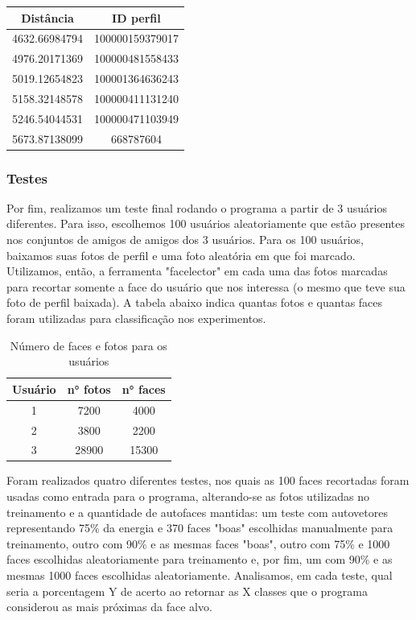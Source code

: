 \documentclass[10pt,a4paper]{article}
\begin{document}
\begin{enumerate}
\begin{table}[h!]
\begin{center}
\begin{tabular}{cc}
Distância & ID perfil \\
\hline
4632.66984794 & 100000159379017\\
4976.20171369 & 100000481558433\\
5019.12654823 & 100001364636243\\
5158.32148578 & 100000411131240\\
5246.54044531 & 100000471103949\\
5673.87138099 & 668787604
\end{tabular}
\end{center}
\end{table}

\end{enumerate}

\subsubsection*{Testes }

Por fim, realizamos um teste final rodando o programa a partir de 3 usuários diferentes. Para isso, escolhemos 100 usuários aleatoriamente que estão presentes nos conjuntos de amigos de amigos dos 3 usuários. Para os 100 usuários, baixamos suas fotos de perfil e uma foto aleatória em que foi marcado. Utilizamos, então, a ferramenta "facelector" em cada uma das fotos marcadas para recortar somente a face do usuário que nos interessa (o mesmo que teve sua foto de perfil baixada). A tabela abaixo indica quantas fotos e quantas faces foram utilizadas para classificação nos experimentos.

\begin{table}[h!]
\begin{center}
\caption{Número de faces e fotos para os usuários}
\begin{tabular}{ccc}
\hline
Usuário & n° fotos & n° faces \\
\hline
\hline
1 & 7200 & 4000 \\
2 & 3800 & 2200 \\
3 & 28900 & 15300 
\end{tabular}
\end{center}
\end{table}

Foram realizados quatro diferentes testes, nos quais as 100 faces recortadas foram usadas como entrada para o programa, alterando-se as fotos utilizadas no treinamento e a quantidade de autofaces mantidas: um teste com autovetores representando 75\% da energia e 370 faces "boas" escolhidas manualmente para treinamento, outro com 90\% e as mesmas faces "boas", outro com 75\% e 1000 faces escolhidas aleatoriamente para treinamento e, por fim, um com 90\% e as mesmas 1000 faces escolhidas aleatoriamente. Analisamos, em cada teste, qual seria a porcentagem Y de acerto ao retornar as X classes que o programa considerou as mais próximas da face alvo.
\end{document}
